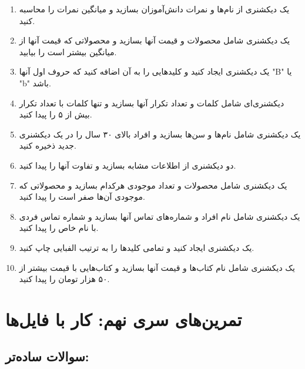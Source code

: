 \documentclass[b5paper,12pt]{article}
\begin{document}
	\begin{enumerate}
		\item یک دیکشنری از نام‌ها و نمرات دانش‌آموزان بسازید و میانگین نمرات را محاسبه کنید.
		\item یک دیکشنری شامل محصولات و قیمت آنها بسازید و محصولاتی که قیمت آنها از میانگین بیشتر است را بیابید.
		\item یک دیکشنری ایجاد کنید و کلیدهایی را به آن اضافه کنید که حروف اول آنها "B" یا "b" باشد.
		\item دیکشنری‌ای شامل کلمات و تعداد تکرار آنها بسازید و تنها کلمات با تعداد تکرار بیش از ۵ را پیدا کنید.
		\item یک دیکشنری شامل نام‌ها و سن‌ها بسازید و افراد بالای ۳۰ سال را در یک دیکشنری جدید ذخیره کنید.
		\item دو دیکشنری از اطلاعات مشابه بسازید و تفاوت آنها را پیدا کنید.
		\item یک دیکشنری شامل محصولات و تعداد موجودی هرکدام بسازید و محصولاتی که موجودی آن‌ها صفر است را پیدا کنید.
		\item یک دیکشنری شامل نام افراد و شماره‌های تماس آنها بسازید و شماره تماس فردی با نام خاص را پیدا کنید.
		\item یک دیکشنری ایجاد کنید و تمامی کلیدها را به ترتیب الفبایی چاپ کنید.
		\item یک دیکشنری شامل نام کتاب‌ها و قیمت آنها بسازید و کتاب‌هایی با قیمت بیشتر از ۵۰ هزار تومان را پیدا کنید.
	\end{enumerate}
	
	
	
	\newpage
	\section*{تمرین‌های سری نهم: کار با فایل‌ها}
	
	\subsection*{سوالات ساده‌تر:}
	
\end{document}
